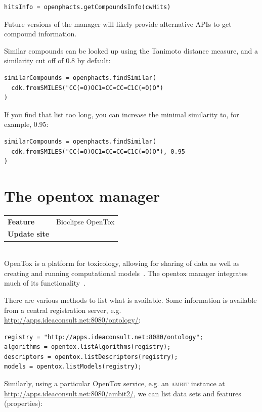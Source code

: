 \documentclass[a5paper, 10pt]{memoir}
\begin{document}
\begin{refsection}
\begin{Verbatim}
hitsInfo = openphacts.getCompoundsInfo(cwHits)
\end{Verbatim}
Future versions of the manager will likely provide alternative APIs to get
compound information.

Similar compounds can be looked up using the Tanimoto distance measure, and a
similarity cut off of 0.8 by default:

\begin{Verbatim}
similarCompounds = openphacts.findSimilar(
  cdk.fromSMILES("CC(=O)OC1=CC=CC=C1C(=O)O")
)
\end{Verbatim}
If you find that list too long, you can increase the minimal similarity to, for
example, 0.95:

\begin{Verbatim}
similarCompounds = openphacts.findSimilar(
  cdk.fromSMILES("CC(=O)OC1=CC=CC=C1C(=O)O"), 0.95
)
\end{Verbatim}

\section{The opentox manager}

\begin{tabular}{ll}
\textbf{Feature} & Bioclipse OpenTox \\
\textbf{Update site} & \url{} \\
\end{tabular} \\

\noindent
OpenTox is a platform for toxicology, allowing for sharing of
data as well as creating and running computational
models~\cite{hardy2010collaborative}. The opentox manager integrates much of its
functionality~\cite{willighagen2011computational}.

There are various methods to list what is available. Some information is
available from a central registration server, e.g.
\url{http://apps.ideaconsult.net:8080/ontology/}:

\begin{Verbatim}
registry = "http://apps.ideaconsult.net:8080/ontology";
algorithms = opentox.listAlgorithms(registry);
descriptors = opentox.listDescriptors(registry);
models = opentox.listModels(registry);
\end{Verbatim}
Similarly, using a particular OpenTox service, e.g. an
\textsc{ambit} instance at
\url{http://apps.ideaconsult.net:8080/ambit2/}\cite{jeliazkova2011ambit}, we
can list data sets and features
(properties):


\end{refsection}
\end{document}
